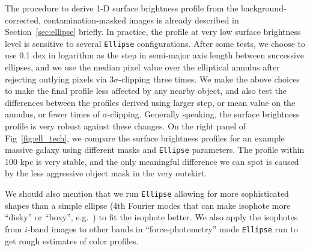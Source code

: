 \documentclass[a4paper,fleqn,usenatbib]{mnras}
\begin{document}
    The procedure to derive 1-D surface brightness profile from the 
    background-corrected, contamination-masked images is already described in 
    Section~\ref{sec:ellipse} briefly. 
    In practice, the profile at very low surface brightness level is sensitive to 
    several \texttt{Ellipse} configurations.
    After some tests, we choose to use 0.1 dex in logarithm as the step in semi-major 
    axis length between successive ellipses, and we use the median pixel value over the
    elliptical annulus after rejecting outlying pixels via $3\sigma$-clipping three
    times.
    We make the above choices to make the final profile less affected by any nearby
    object, and also test the differences between the profiles derived using larger
    step, or mean value on the annulus, or fewer times of $\sigma$-clipping. 
    Generally speaking, the surface brightness profile is very robust against these
    changes.  
    On the right panel of Fig~\ref{fig:ell_tech}, we compare the surface brightness
    profiles for an example massive galaxy using different masks and \texttt{Ellipse}
    parameters. 
    The profile within 100 kpc is very stable, and the only meaningful difference 
    we can spot is caused by the less aggressive object mask in the very outskirt.    
    
    We should also mention that we run \texttt{Ellipse} allowing for more 
    sophisticated shapes than a simple ellipse (4th Fourier modes that can make 
    isophote more ``disky'' or ``boxy'', e.g.\ \citealt{Kormendy2009}) to fit the 
    isophote better.
    We also apply the isophotes from $i$-band images to other bands in 
    ``force-photometry'' mode \texttt{Ellipse} run to get rough estimates of 
    color profiles.  
    
\end{document}

